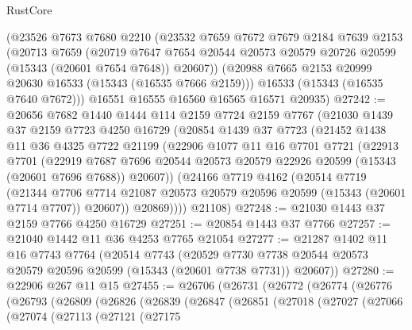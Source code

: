 \begin{lexlean}{RustCore}
\begin{coremodule}
    (@23526
      @7673
      @7680
      @2210
      (@23532
        @7659
        @7672
        @7679
        @2184
        @7639
        @2153
        (@20713
          @7659
          (@20719
            @7647
            @7654
            @20544
            @20573
            @20579
            @20726
            @20599
            (@15343 (@20601 @7654 @7648))
            @20607))
        (@20988 @7665 @2153 @20999 @20630 @16533 (@15343 (@16535 @7666 @2159)))
        @16533
        (@15343 (@16535 @7640 @7672)))
      @16551
      @16555
      @16560
      @16565
      @16571
      @20935)
@27242 := @20656
    @7682
    @1440
    @1444
    @114
    @2159
    @7724
    @2159
    @7767
    (@21030
      @1439
      @37
      @2159
      @7723
      @4250
      @16729
      (@20854
        @1439
        @37
        @7723
        (@21452
          @1438
          @11
          @36
          @4325
          @7722
          @21199
          (@22906
            @1077
            @11
            @16
            @7701
            @7721
            (@22913
              @7701
              (@22919
                @7687
                @7696
                @20544
                @20573
                @20579
                @22926
                @20599
                (@15343 (@20601 @7696 @7688))
                @20607))
            (@24166
              @7719
              @4162
              (@20514
                @7719
                (@21344
                  @7706
                  @7714
                  @21087
                  @20573
                  @20579
                  @20596
                  @20599
                  (@15343 (@20601 @7714 @7707))
                  @20607))
              @20869))))
      @21108)
@27248 := @21030 @1443 @37 @2159 @7766 @4250 @16729
@27251 := @20854 @1443 @37 @7766
@27257 := @21040 @1442 @11 @36 @4253 @7765 @21054
@27277 := @21287
    @1402
    @11
    @16
    @7743
    @7764
    (@20514
      @7743
      (@20529 @7730 @7738 @20544 @20573 @20579 @20596 @20599 (@15343 (@20601 @7738 @7731)) @20607))
@27280 := @22906 @267 @11 @15
@27455 := @26706
    (@26731
      (@26772
        (@26774
          (@26776
            (@26793
              (@26809
                (@26826
                  (@26839
                    (@26847
                      (@26851
                        (@27018
                          (@27027
                            (@27066
                              (@27074
                                (@27113
                                  (@27121
                                    (@27175

\end{coremodule}
\end{lexlean}
